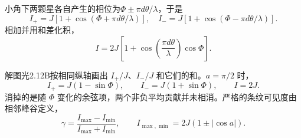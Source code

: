 \documentclass[UTF8,fontset=fandol,a4paper,11pt]{ctexart}
\begin{document}
小角下两颗星各自产生的相位为$\Phi\pm\pi d\theta/\lambda$，于是
\[
I_+=J[1+\cos(\Phi+\pi d\theta/\lambda)],\quad
I_-=J[1+\cos(\Phi-\pi d\theta/\lambda)].
\]
相加并用和差化积，
\[
I=2J\left[1+\cos\left(\frac{\pi d\theta}{\lambda}\right)\cos\Phi\right].
\]

解图光2.12B按相同纵轴画出 $I_+/J$、$I_-/J$ 和它们的和。$a=\pi/2$ 时，
\[
I_+=J(1-\sin\Phi),\qquad I_-=J(1+\sin\Phi),\qquad I=2J.
\]
消掉的是随 $\Phi$ 变化的余弦项，两个非负平均贡献并未相消。严格的条纹可见度由相邻峰谷定义，
\[
\gamma=\frac{I_{\max}-I_{\min}}{I_{\max}+I_{\min}},\qquad
I_{\max,\min}=2J(1\pm|\cos a|).
\]
\begin{center}\begin{minipage}{.98\linewidth}\centering
{}
\end{minipage}
\end{center}
\end{document}
